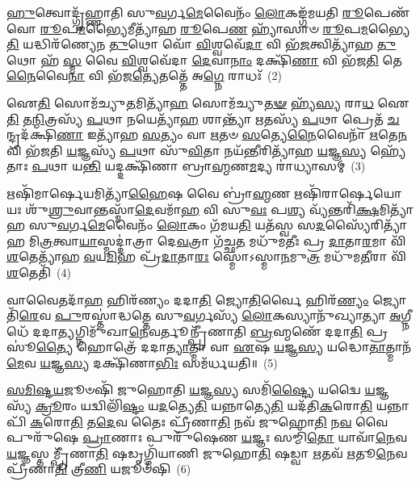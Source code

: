 \-\ul{𑌹𑍁}\-𑌤𑍍𑌵𑍋𑌦𑍍𑌗𑍃᳴𑌹𑍍𑌣𑌾𑌤𑌿 𑌸𑍁\-\ul{𑌵}\-𑌰𑍍𑌗\-\ul{𑌮𑍇}\-𑌵𑍈𑌨𑌂᳴ \ul{𑌲𑍋}\-𑌕𑌙𑍍𑌗᳴𑌮𑌯𑌤𑌿 \ul{𑌰𑍂}\-𑌪𑍇𑌣᳴ 𑌵𑍋 \ul{𑌰𑍂}\-𑌪\-\ul{𑌮}\-𑌭𑍍𑌯𑍈𑌮𑍀𑌤𑍍𑌯𑌾᳴𑌹 \ul{𑌰𑍂}\-𑌪𑍇\-\ul{𑌣} 𑌹𑍍𑌯𑌾᳴𑌸𑌾𑍞 \ul{𑌰𑍂}\-𑌪\-\ul{𑌮}\-𑌭𑍍𑌯𑍈\-\ul{𑌤𑌿} 𑌯𑌦𑍍𑌧𑌿𑌰᳴𑌣𑍍𑌯𑍇𑌨 \ul{𑌤𑍁}\-𑌥𑍋 𑌵𑍋᳴ \ul{𑌵𑌿}\-𑌶𑍍𑌵𑌵𑍇᳴\-\ul{𑌦𑌾} 𑌵𑌿 𑌭᳴\-\ul{𑌜}\-𑌤𑍍𑌵𑌿𑌤𑍍𑌯𑌾᳴𑌹 \ul{𑌤𑍁}\-𑌥𑍋 𑌹᳴ \ul{𑌸𑍍𑌮} 𑌵𑍈 \ul{𑌵𑌿}\-𑌶𑍍𑌵𑌵𑍇᳴𑌦𑌾 \ul{𑌦𑍇}\-𑌵𑌾\-\ul{𑌨𑌾𑌂} 𑌦𑌕𑍍𑌷𑌿᳴\-\ul{𑌣𑌾} 𑌵𑌿 𑌭᳴𑌜\-\ul{𑌤𑌿} 𑌤𑍇\-\ul{𑌨𑍈}\-𑌵𑍈\-\ul{𑌨𑌾} 𑌵𑌿 𑌭᳴𑌜\-\ul{𑌤𑍍𑌯𑍇}\-𑌤𑌤𑍍𑌤𑍇᳴ 𑌅\-\ul{𑌗𑍍𑌨𑍇} 𑌰𑌾𑌧𑌃᳴~(2)

𑌐\-\ul{𑌤𑌿} 𑌸𑍋𑌮᳴𑌚𑍍𑌯𑍁\-\ul{𑌤}\-𑌮𑌿𑌤𑍍𑌯𑌾᳴\-\ul{𑌹} 𑌸𑍋𑌮᳴𑌚𑍍𑌯𑍁\-\ul{𑌤}\-\-\ul{𑍟} 𑌹𑍍𑌯᳴\-\ul{𑌸𑍍𑌯} 𑌰𑌾\-\ul{𑌧} 𑌐\-\ul{𑌤𑌿} 𑌤\-\ul{𑌨𑍍𑌮𑌿}\-𑌤𑍍𑌰𑌸𑍍𑌯᳴ \ul{𑌪}\-𑌥𑌾 \ul{𑌨}\-𑌯𑍇𑌤𑍍𑌯𑌾᳴\-\ul{𑌹} 𑌶𑌾𑌨𑍍𑌤𑍍𑌯𑌾᳴ \ul{𑌋}\-𑌤𑌸𑍍𑌯᳴ \ul{𑌪}\-𑌥𑌾 𑌪𑍍𑌰𑍇𑌤᳴ \ul{𑌚}\-𑌨𑍍𑌦𑍍𑌰𑌦᳴𑌕𑍍𑌷𑌿\-\ul{𑌣𑌾} 𑌇𑌤𑍍𑌯𑌾᳴𑌹 \ul{𑌸}\-𑌤𑍍𑌯𑌂 𑌵𑌾 \ul{𑌋}\-𑌤𑍞 \ul{𑌸}\-𑌤𑍍𑌯𑍇\-\ul{𑌨𑍈}\-𑌵𑍈𑌨𑌾᳴ \ul{𑌋}\-𑌤𑍇\-\ul{𑌨} 𑌵𑌿 𑌭᳴𑌜𑌤𑌿 \ul{𑌯}\-𑌜𑍍𑌞𑌸𑍍𑌯᳴ \ul{𑌪}\-𑌥𑌾 𑌸𑍁᳴\-\ul{𑌵𑌿}\-𑌤𑌾 𑌨𑌯᳴\-\ul{𑌨𑍍𑌤𑍀}\-𑌰𑌿𑌤𑍍𑌯𑌾᳴𑌹 \ul{𑌯}\-𑌜𑍍𑌞\-\ul{𑌸𑍍𑌯} 𑌹𑍍𑌯𑍇᳴𑌤𑌾𑌃 \ul{𑌪}\-𑌥𑌾 𑌯\-\ul{𑌨𑍍𑌤𑌿} 𑌯𑌦𑍍𑌦𑌕𑍍𑌷𑌿᳴𑌣𑌾 𑌬𑍍𑌰𑌾\-\ul{𑌹𑍍𑌮}\-𑌣\-\ul{𑌮}\-𑌦𑍍𑌯 𑌰𑌾॑𑌧𑍍𑌯𑌾𑌸𑌮𑍍~(3)

𑌋𑌷𑌿᳴𑌮𑌾𑌰𑍍\mbox{}\-\ul{𑌷𑍇}\-𑌯𑌮𑌿𑌤𑍍𑌯𑌾᳴\-\ul{𑌹𑍈}\-𑌷 𑌵𑍈 𑌬𑍍𑌰𑌾॑\-\ul{𑌹𑍍𑌮}\-𑌣 𑌋𑌷𑌿᳴𑌰𑌾𑌰𑍍\mbox{}\-\ul{𑌷𑍇}\-𑌯𑍋 𑌯𑌃 𑌶𑍁᳴\-\ul{𑌶𑍍𑌰𑍁}\-𑌵𑌾𑌨𑍍𑌤𑌸𑍍𑌮𑌾᳴\-\ul{𑌦𑍇}\-𑌵𑌮𑌾᳴\-\ul{𑌹} 𑌵𑌿 𑌸𑍁\-\ul{𑌵𑌃} 𑌪\-\ul{𑌶𑍍𑌯} 𑌵𑍍𑌯᳴𑌨𑍍𑌤𑌰𑌿᳴\-\ul{𑌕𑍍𑌷}\-𑌮𑌿𑌤𑍍𑌯𑌾᳴𑌹 𑌸𑍁\-\ul{𑌵}\-𑌰𑍍𑌗\-\ul{𑌮𑍇}\-𑌵𑍈𑌨𑌂᳴ \ul{𑌲𑍋}\-𑌕𑌂 𑌗᳴𑌮𑌯\-\ul{𑌤𑌿} 𑌯𑌤᳴𑌸𑍍𑌵 𑌸\-\ul{𑌦}\-𑌸𑍍𑌯𑍈᳴𑌰𑌿𑌤𑍍𑌯𑌾᳴𑌹 𑌮𑌿\-\ul{𑌤𑍍𑌰}\-𑌤𑍍𑌵𑌾\-\ul{𑌯𑌾}\-𑌸𑍍𑌮𑌦𑍍𑌦𑌾॑𑌤𑍍𑌰𑌾 𑌦𑍇\-\ul{𑌵}\-𑌤𑍍𑌰𑌾 𑌗᳴𑌚𑍍𑌛\-\ul{𑌤} 𑌮𑌧𑍁᳴𑌮𑌤𑍀𑌃 𑌪𑍍𑌰 \ul{𑌦𑌾}\-𑌤𑌾\-\ul{𑌰}\-𑌮𑌾 𑌵𑌿᳴\-\ul{𑌶}\-𑌤𑍇𑌤𑍍𑌯𑌾᳴𑌹 \ul{𑌵}\-𑌯\-\ul{𑌮𑌿}\-𑌹 𑌪𑍍𑌰᳴\-\ul{𑌦𑌾}\-𑌤𑌾\-\ul{𑌰𑌃} 𑌸𑍍𑌮𑍋॑\-𑌽𑌸𑍍𑌮𑌾\-\ul{𑌨}\-𑌮𑍁\-\ul{𑌤𑍍𑌰} 𑌮𑌧𑍁᳴𑌮\-\ul{𑌤𑍀}\-𑌰𑌾 𑌵𑌿᳴\-\ul{𑌶}\-𑌤𑍇𑌤𑌿᳴~(4)

𑌵𑌾𑌵𑍈𑌤𑌦𑌾᳴\-\ul{𑌹} 𑌹𑌿𑌰᳴𑌣𑍍𑌯𑌂 𑌦𑌦𑌾\-\ul{𑌤𑌿} 𑌜𑍍𑌯𑍋\-\ul{𑌤𑌿}\-𑌰𑍍𑌵𑍈 𑌹𑌿𑌰᳴\-\ul{𑌣𑍍𑌯𑌂} 𑌜𑍍𑌯𑍋𑌤𑌿᳴\-\ul{𑌰𑍇}\-𑌵 \ul{𑌪𑍁}\-𑌰𑌸𑍍𑌤𑌾॑𑌦𑍍𑌧𑌤𑍍𑌤𑍇 𑌸𑍁\-\ul{𑌵}\-𑌰𑍍𑌗𑌸𑍍𑌯᳴ \ul{𑌲𑍋}\-𑌕𑌸𑍍𑌯𑌾𑌨𑍁᳴𑌖𑍍𑌯𑌾𑌤𑍍𑌯𑌾 \ul{𑌅}\-𑌗𑍍𑌨𑍀𑌧𑍇᳴ 𑌦𑌦𑌾\-\ul{𑌤𑍍𑌯}\-𑌗𑍍𑌨𑌿𑌮𑍁᳴𑌖𑌾\-\ul{𑌨𑍇}\-𑌵𑌰𑍍𑌤𑍂𑌨𑍍𑌪𑍍𑌰𑍀᳴𑌣𑌾𑌤𑌿 \ul{𑌬𑍍𑌰}\-𑌹𑍍𑌮𑌣𑍇᳴ 𑌦𑌦𑌾\-\ul{𑌤𑌿} 𑌪𑍍𑌰𑌸𑍂॑\-\ul{𑌤𑍍𑌯𑍈} 𑌹𑍋𑌤𑍍𑌰𑍇᳴ 𑌦𑌦𑌾\-\ul{𑌤𑍍𑌯𑌾}\-𑌤𑍍𑌮𑌾 𑌵𑌾 \ul{𑌏}\-𑌷 \ul{𑌯}\-𑌜𑍍𑌞\-\ul{𑌸𑍍𑌯} 𑌯𑌦𑍍𑌧𑍋\-\ul{𑌤𑌾}\-𑌤𑍍𑌮𑌾𑌨᳴\-\ul{𑌮𑍇}\-𑌵 \ul{𑌯}\-𑌜𑍍𑌞\-\ul{𑌸𑍍𑌯} 𑌦𑌕𑍍𑌷𑌿᳴𑌣𑌾\-\ul{𑌭𑌿𑌃} 𑌸𑌮᳴𑌰𑍍𑌧𑌯𑌤𑌿॥~(5)

{\anuvakamend[{𑌹𑌿𑌰᳴\-\ul{𑌣𑍍𑌯}\-\-\ul{𑍞} 𑌰𑌾𑌧𑍋᳴ 𑌰𑌾𑌧𑍍𑌯𑌾𑌸\-\ul{𑌮}\-𑌮𑍁\-\ul{𑌤𑍍𑌰} 𑌮𑌧𑍁᳴𑌮\-\ul{𑌤𑍀}\-𑌰𑌾 𑌵𑌿᳴\-\ul{𑌶}\-𑌤𑍇\-\ul{𑌤𑍍𑌯}\-𑌷𑍍𑌟𑌾𑌤𑍍𑌰𑌿𑍞᳴𑌶𑌚𑍍𑌚}]}%

\-\ul{𑌸}\-\-\ul{𑌮𑌿}\-\-\ul{𑌷𑍍𑌟}\-\-\ul{𑌯}\-𑌜𑍂𑍞𑌷𑌿᳴ 𑌜𑍁𑌹𑍋𑌤𑌿 \ul{𑌯}\-𑌜𑍍𑌞\-\ul{𑌸𑍍𑌯} 𑌸𑌮𑌿᳴\-\ul{𑌷𑍍𑌟𑍍𑌯𑍈} 𑌯𑌦𑍍𑌵𑍈 \ul{𑌯}\-𑌜𑍍𑌞𑌸𑍍𑌯᳴ \ul{𑌕𑍍𑌰𑍂}\-𑌰𑌂 𑌯𑌦𑍍𑌵𑌿𑌲𑌿᳴\-\ul{𑌷𑍍𑌟𑌂} 𑌯\-\ul{𑌦}\-𑌤𑍍𑌯𑍇\-\ul{𑌤𑌿} 𑌯𑌨𑍍𑌨𑌾𑌤𑍍𑌯𑍇\-\ul{𑌤𑌿} 𑌯𑌦᳴𑌤𑌿\-\ul{𑌕}\-𑌰𑍋\-\ul{𑌤𑌿} 𑌯𑌨𑍍𑌨𑌾𑌪𑌿᳴ \ul{𑌕}\-𑌰𑍋\-\ul{𑌤𑌿} 𑌤\-\ul{𑌦𑍇}\-𑌵 𑌤𑍈𑌃 𑌪𑍍𑌰𑍀᳴𑌣𑌾\-\ul{𑌤𑌿} 𑌨𑌵᳴ 𑌜𑍁𑌹𑍋\-\ul{𑌤𑌿} 𑌨\-\ul{𑌵} 𑌵𑍈 𑌪𑍁𑌰𑍁᳴𑌷𑍇 \ul{𑌪𑍍𑌰𑌾}\-𑌣𑌾𑌃 𑌪𑍁𑌰𑍁᳴𑌷𑍇𑌣 \ul{𑌯}\-𑌜𑍍𑌞𑌃 𑌸𑌮𑍍𑌮𑌿᳴\-\ul{𑌤𑍋} 𑌯𑌾𑌵𑌾᳴\-\ul{𑌨𑍇}\-𑌵 \ul{𑌯}\-𑌜𑍍𑌞𑌸𑍍𑌤𑌮𑍍𑌪𑍍𑌰𑍀᳴𑌣𑌾\-\ul{𑌤𑌿} 𑌷𑌡𑍃𑌗𑍍𑌮𑌿᳴𑌯𑌾𑌣𑌿 𑌜𑍁𑌹𑍋\-\ul{𑌤𑌿} 𑌷𑌡𑍍𑌵𑌾 \ul{𑌋}\-𑌤𑌵᳴ \ul{𑌋}\-𑌤𑍂\-\ul{𑌨𑍇}\-𑌵 𑌪𑍍𑌰𑍀᳴𑌣𑌾\-\ul{𑌤𑌿} 𑌤𑍍𑌰𑍀\-\ul{𑌣𑌿} 𑌯𑌜𑍂𑍞᳴𑌷𑌿~(6)

